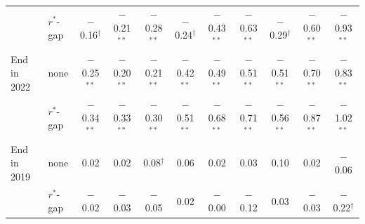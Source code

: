 \begin{tabular}{llccccccccc}
 & $r^*$-gap & $-$0.16$^{\dagger}$ & $-$0.21$^{**}$ & $-$0.28$^{**}$ & $-$0.24$^{\dagger}$ & $-$0.43$^{**}$ & $-$0.63$^{**}$ & $-$0.29$^{\dagger}$ & $-$0.60$^{**}$ & $-$0.93$^{**}$ \\
End in 2022 & none & $-$0.25$^{**}$ & $-$0.20$^{**}$ & $-$0.21$^{**}$ & $-$0.42$^{**}$ & $-$0.49$^{**}$ & $-$0.51$^{**}$ & $-$0.51$^{**}$ & $-$0.70$^{**}$ & $-$0.83$^{**}$ \\
 & $r^*$-gap & $-$0.34$^{**}$ & $-$0.33$^{**}$ & $-$0.30$^{**}$ & $-$0.51$^{**}$ & $-$0.68$^{**}$ & $-$0.71$^{**}$ & $-$0.56$^{**}$ & $-$0.87$^{**}$ & $-$1.02$^{**}$ \\
End in 2019 & none & 0.02 & 0.02 & 0.08$^{\dagger}$ & 0.06 & 0.02 & 0.03 & 0.10 & 0.02 & $-$0.06 \\
 & $r^*$-gap & $-$0.02 & $-$0.03 & $-$0.05 & 0.02 & $-$0.00 & $-$0.12 & 0.03 & $-$0.03 & $-$0.22$^{\dagger}$ \\
\bottomrule
\end{tabular}
